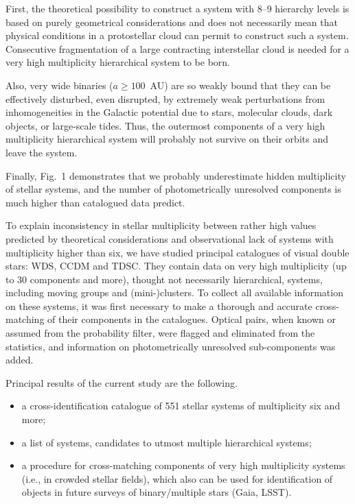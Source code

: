 \documentclass[10pt,a4paper,twoside]{article}
\begin{document}
First, the theoretical possibility to construct a system with 8--9
hierarchy levels is based on purely geometrical considerations and
does not necessarily mean that physical conditions in a
protostellar cloud can permit to construct such a system.
Consecutive fragmentation of a large contracting interstellar
cloud is needed for a very high multiplicity hierarchical system
to be born.

Also, very wide binaries ($a \ge 100$~AU) are so weakly bound that
they can be effectively disturbed, even disrupted, by extremely
weak perturbations from inhomogeneities in the Galactic potential
due to stars, molecular clouds, dark objects, or large-scale
tides. Thus, the outermost components of a very high multiplicity
hierarchical system will probably not survive on their orbits and
leave the system.

Finally, Fig.~1 demonstrates that we probably underestimate hidden
multiplicity of stellar systems, and the number of photometrically
unresolved components is much higher than catalogued data predict.



To explain inconsistency in stellar multiplicity between rather
high values predicted by theoretical considerations and
observational lack of systems with multiplicity higher than six,
we have studied principal catalogues of visual double stars: WDS,
CCDM and TDSC. They contain data on very high multiplicity (up to
30 components and more), thought not necessarily hierarchical,
systems, including moving groups and (mini-)clusters. To collect
all available information on these systems, it was first necessary
to make a thorough and accurate cross-matching of their components
in the catalogues. Optical pairs, when known or assumed from the
probability filter, were flagged and eliminated from the
statistics, and information on photometrically unresolved
sub-components was added.

Principal results of the current study are the following.
\begin{itemize}
\item a cross-identification catalogue of 551 stellar systems of
multiplicity six and more; \item a list of systems, candidates to
utmost multiple hierarchical systems; \item a procedure for
cross-matching components of very high multiplicity systems (i.e.,
in crowded stellar fields), which also can be used for
identification of objects in future surveys of binary/multiple
stars (Gaia, LSST).
\end{itemize}
\end{document}
